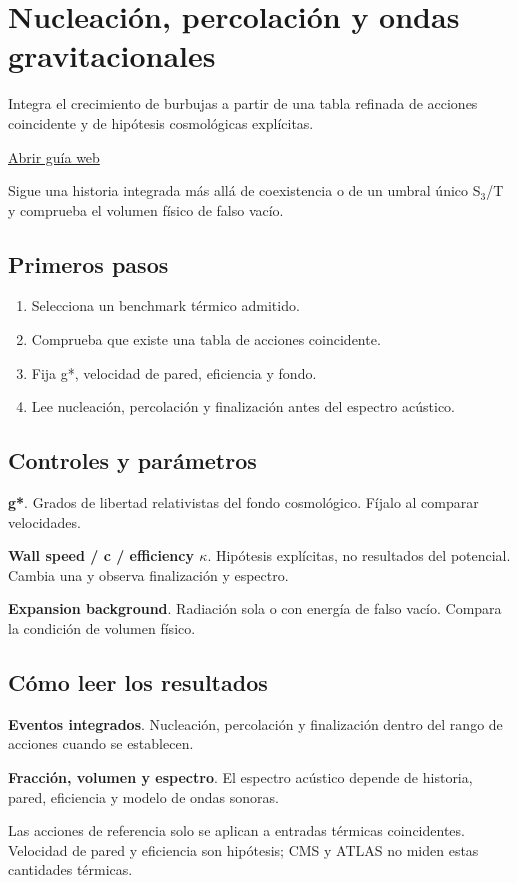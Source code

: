 \documentclass[11pt,a4paper]{article}
\begin{document}
\section{Nucleación, percolación y ondas gravitacionales}
Integra el crecimiento de burbujas a partir de una tabla refinada de acciones coincidente y de hipótesis cosmológicas explícitas.

\href{https://karlesmarin.github.io/ghu-explorer/guide/es/thermalhistory/index.html}{Abrir guía web}

Sigue una historia integrada más allá de coexistencia o de un umbral único S\ensuremath{{}_{3}}/T y comprueba el volumen físico de falso vacío.
\subsection*{Primeros pasos}
\begin{enumerate}
\item Selecciona un benchmark térmico admitido.
\item Comprueba que existe una tabla de acciones coincidente.
\item Fija g*, velocidad de pared, eficiencia y fondo.
\item Lee nucleación, percolación y finalización antes del espectro acústico.
\end{enumerate}
\subsection*{Controles y parámetros}
\textbf{g*}. Grados de libertad relativistas del fondo cosmológico. Fíjalo al comparar velocidades.

\textbf{Wall speed / c / efficiency \ensuremath{\kappa}}. Hipótesis explícitas, no resultados del potencial. Cambia una y observa finalización y espectro.

\textbf{Expansion background}. Radiación sola o con energía de falso vacío. Compara la condición de volumen físico.

\subsection*{Cómo leer los resultados}
\textbf{Eventos integrados}. Nucleación, percolación y finalización dentro del rango de acciones cuando se establecen.

\textbf{Fracción, volumen y espectro}. El espectro acústico depende de historia, pared, eficiencia y modelo de ondas sonoras.

Las acciones de referencia solo se aplican a entradas térmicas coincidentes. Velocidad de pared y eficiencia son hipótesis; CMS y ATLAS no miden estas cantidades térmicas.
\end{document}
